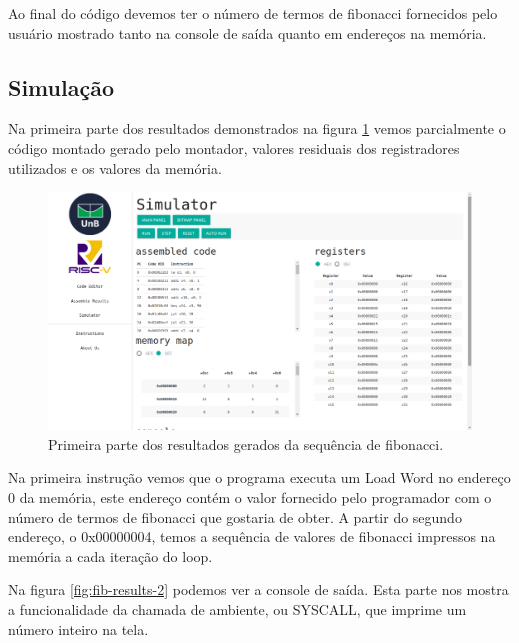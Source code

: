 	Ao final do código devemos ter o número de termos de fibonacci fornecidos pelo usuário mostrado tanto na console de saída quanto em endereços na memória.



\subsection{Simulação}

	
	Na primeira parte dos resultados demonstrados na figura \ref{fig:fib-results-1} vemos parcialmente o código montado gerado pelo montador, valores residuais dos registradores utilizados e os valores da memória.

	\begin{figure}[h]
	  \centering
	  \includegraphics[width=14cm]{img/fibonacci_results_1.png}
	  \caption{Primeira parte dos resultados gerados da sequência de fibonacci.}
	  \label{fig:fib-results-1}
	\end{figure}

	Na primeira instrução vemos que o programa executa um Load Word no endereço 0 da memória, este endereço contém o valor fornecido pelo programador com o número de termos de fibonacci que gostaria de obter. A partir do segundo endereço, o 0x00000004, temos a sequência de valores de fibonacci impressos na memória a cada iteração do loop.

	Na figura \ref{fig:fib-results-2} podemos ver a console de saída. Esta parte nos mostra a funcionalidade da chamada de ambiente, ou SYSCALL, que imprime um número inteiro na tela. 

